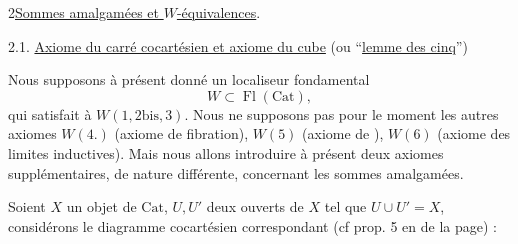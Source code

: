 2\quad \uline{Sommes amalgamées et $W$-équivalences}.

2.1. \uline{Axiome du carré cocartésien et axiome du cube} (ou ``\uline{lemme des cinq}'')

Nous supposons à présent donné un localiseur
fondamental
\[
W\subset\operatorname{Fl}(\mathrm{Cat}),
\]
qui satisfait à $W(1,2\mathrm{bis},3)$. Nous ne supposons
pas pour le moment  les  autres axiomes
 $W(4.)$  (axiome de fibration), $W(5)$
(axiome de ), $W(6)$ (axiome des
limites inductives). Mais nous allons introduire
à présent deux axiomes  supplémentaires, de
nature différente,  concernant les sommes
amalgamées.

  Soient $X$ un objet de $\mathrm{Cat}$, $U,U'$ deux
ouverts de $X$ tel que $U\cup U'=X$, considérons le
diagramme cocartésien correspondant (cf prop. 5 en
 de la page) :
